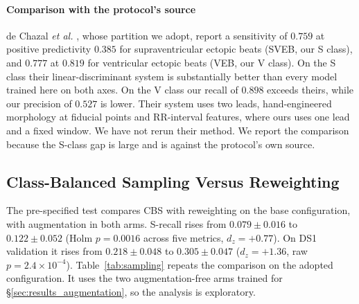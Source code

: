 \documentclass[preprint,12pt]{elsarticle}
\begin{document}
\paragraph{Comparison with the protocol's source} de Chazal \emph{et al.} \cite{chazal_automatic_2004}, whose partition we adopt, report a sensitivity of $0.759$ at positive predictivity $0.385$ for supraventricular ectopic beats (SVEB, our S class), and $0.777$ at $0.819$ for ventricular ectopic beats (VEB, our V class). On the S class their linear-discriminant system is substantially better than every model trained here on both axes. On the V class our recall of $0.898$ exceeds theirs, while our precision of $0.527$ is lower. Their system uses two leads, hand-engineered morphology at fiducial points and RR-interval features, where ours uses one lead and a fixed window. We have not rerun their method. We report the comparison because the S-class gap is large and is against the protocol's own source.

\subsection{Class-Balanced Sampling Versus Reweighting}
\label{sec:results_sampling}
The pre-specified test compares CBS with reweighting on the base configuration, with augmentation in both arms. S-recall rises from $0.079\pm0.016$ to $0.122\pm0.052$ (Holm $p = 0.0016$ across five metrics, $d_z = +0.77$). On DS1 validation it rises from $0.218\pm0.048$ to $0.305\pm0.047$ ($d_z = +1.36$, raw $p = 2.4\times10^{-4}$). Table~\ref{tab:sampling} repeats the comparison on the adopted configuration. It uses the two augmentation-free arms trained for \S\ref{sec:results_augmentation}, so the analysis is exploratory.
\end{document}
